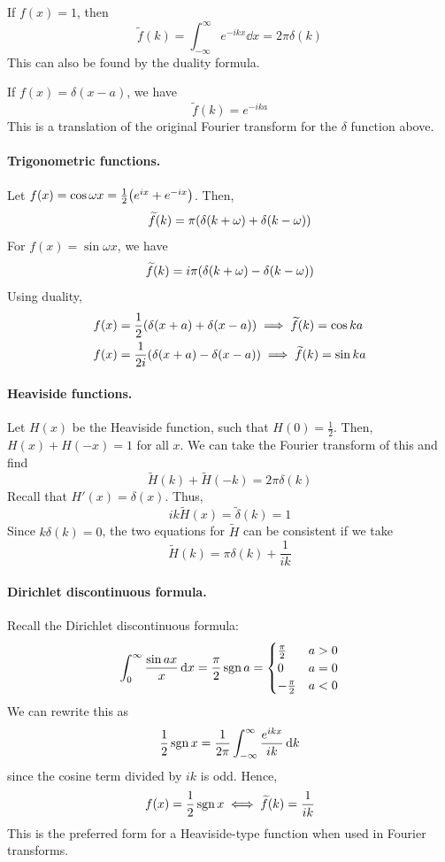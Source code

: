 \documentclass[a4paper]{article}
\begin{document}
If \( f(x) = 1 \), then
\[
	\widetilde f(k) = \int_{-\infty}^\infty e^{-ikx}\dd{x} = 2\pi \delta(k)
\]
This can also be found by the duality formula.

If \( f(x) = \delta(x - a) \), we have
\[
	\widetilde f(k) = e^{-ika}
\]
This is a translation of the original Fourier transform for the \( \delta \) function above.

\paragraph{Trigonometric functions.}
Let \( f(x) = \cos \omega x = \frac{1}{2} \qty(e^{ix} + e^{-ix}) \).
Then,
\[
	\widetilde f(k) = \pi\qty(\delta(k+\omega) + \delta(k-\omega))
\]
For \( f(x) = \sin \omega x \), we have
\[
	\widetilde f(k) = i\pi\qty(\delta(k+\omega) - \delta(k-\omega))
\]
Using duality,
\begin{align*}
	f(x) & = \frac{1}{2}\qty(\delta(x+a) + \delta(x-a)) \implies \widetilde f(k) = \cos ka  \\
	f(x) & = \frac{1}{2i}\qty(\delta(x+a) - \delta(x-a)) \implies \widetilde f(k) = \sin ka
\end{align*}

\paragraph{Heaviside functions.}
Let \( H(x) \) be the Heaviside function, such that \( H(0) = \frac{1}{2} \).
Then, \( H(x) + H(-x) = 1 \) for all \( x \).
We can take the Fourier transform of this and find
\[
	\widetilde H(k) + \widetilde H(-k) = 2\pi \delta(k)
\]
Recall that \( H'(x) = \delta(x) \).
Thus,
\[
	ik \widetilde H(x) = \widetilde \delta(k) = 1
\]
Since \( k \delta(k) = 0 \), the two equations for \( \widetilde H \) can be consistent if we take
\[
	\widetilde H(k) = \pi\delta(k) + \frac{1}{ik}
\]

\paragraph{Dirichlet discontinuous formula.}
Recall the Dirichlet discontinuous formula:
\[
	\int_0^\infty \frac{\sin ax}{x} \dd{x} = \frac{\pi}{2} \operatorname{sgn} a = \begin{cases}
		\frac{\pi}{2}  & a > 0 \\
		0              & a = 0 \\
		-\frac{\pi}{2} & a < 0
	\end{cases}
\]
We can rewrite this as
\[
	\frac{1}{2} \operatorname{sgn} x = \frac{1}{2\pi} \int_{-\infty}^\infty \frac{e^{ikx}}{ik} \dd{k}
\]
since the cosine term divided by \( ik \) is odd.
Hence,
\[
	f(x) = \frac{1}{2} \operatorname{sgn} x \iff \widetilde f(k) = \frac{1}{ik}
\]
This is the preferred form for a Heaviside-type function when used in Fourier transforms.
\end{document}

